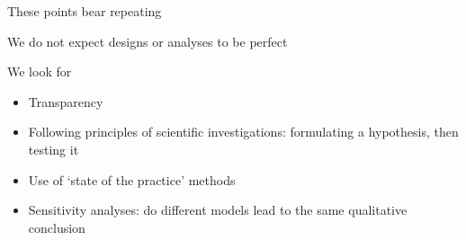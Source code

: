 \documentclass[ignorenonframetext,]{beamer}
\begin{document}
\begin{frame}{These points bear repeating}

We do not expect designs or analyses to be perfect

We look for

\begin{itemize}
\item
  Transparency
\item
  Following principles of scientific investigations: formulating a
  hypothesis, then testing it
\item
  Use of `state of the practice' methods
\item
  Sensitivity analyses: do different models lead to the same qualitative
  conclusion
\end{itemize}

\end{frame}
\end{document}
